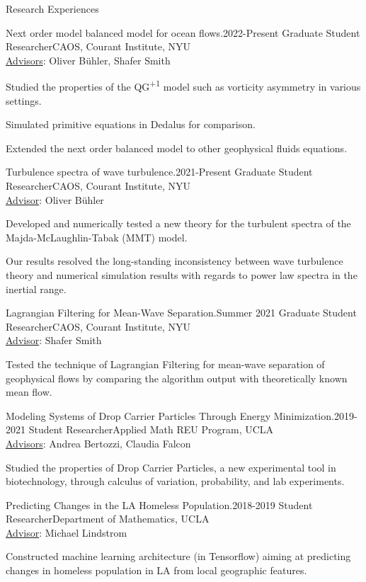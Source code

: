 \documentclass{resume} %
\begin{document}
\begin{rSection}{Research Experiences}
\begin{rSubsection}{Next order model balanced model for ocean flows.}{2022-Present}
{Graduate Student Researcher}{CAOS, Courant Institute, NYU\\\underline{Advisors}: Oliver B\"uhler, Shafer Smith}
\item Studied the properties of the QG\textsuperscript{+1} model such as vorticity asymmetry in various settings.
\item Simulated primitive equations in Dedalus for comparison.
\item Extended the next order balanced model to other geophysical fluids equations. 
\end{rSubsection}

\begin{rSubsection}{Turbulence spectra of wave turbulence.}{2021-Present}
{Graduate Student Researcher}{CAOS, Courant Institute, NYU\\\underline{Advisor}: Oliver B\"uhler}
\item Developed and numerically tested a new theory for the turbulent spectra of the Majda-McLaughlin-Tabak (MMT) model.
\item Our results resolved the long-standing inconsistency between wave turbulence theory and numerical simulation results with regards to power law spectra in the inertial range.
\end{rSubsection}

\begin{rSubsection}{Lagrangian Filtering for Mean-Wave Separation.}{Summer 2021}
{Graduate Student Researcher}{CAOS, Courant Institute, NYU\\\underline{Advisor}: Shafer Smith}
\item Tested the technique of Lagrangian Filtering for mean-wave separation of geophysical flows by comparing the algorithm output with theoretically known mean flow.
\end{rSubsection}

\begin{rSubsection}{Modeling Systems of Drop Carrier Particles Through Energy
Minimization.}{2019-2021}
{Student Researcher}{Applied Math REU Program, UCLA\\\underline{Advisors}: Andrea Bertozzi, Claudia Falcon}
\item Studied the properties of Drop Carrier Particles, a new experimental tool in biotechnology, through calculus of variation, probability, and lab experiments.
\end{rSubsection}

\begin{rSubsection}{Predicting Changes in the LA Homeless Population.}{2018-2019}
{Student Researcher}{Department of Mathematics, UCLA\\\underline{Advisor}: Michael Lindstrom}
\item Constructed machine learning architecture (in Tensorflow) aiming at predicting changes in homeless population in LA from local geographic features. 
\end{rSubsection}

\end{rSection}
\end{document}
